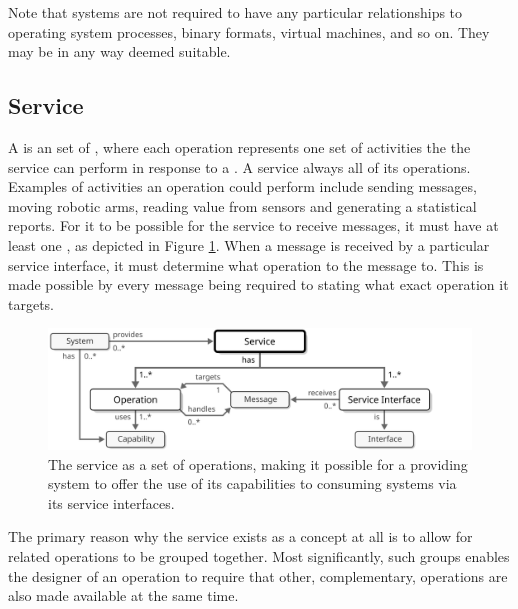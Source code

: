 Note that systems are not required to have any particular relationships to operating system processes, binary formats, virtual machines, and so on.
They may be  in any way deemed suitable.

\subsection{Service}
\label{sec:concepts:service}

A  is an  set of , where each operation represents one set of activities the   the service can perform in response to a .
A  service always  all of its operations.
Examples of activities an operation could perform include sending messages, moving robotic arms, reading value from sensors and generating a statistical reports.
For it to be possible for the service to receive messages, it must have at least one , as depicted in Figure \ref{fig:service}.
When a message is received by a particular service interface, it must determine what operation to  the message to.
This is made possible by every message being required to stating what exact operation it targets.

\begin{figure}[ht!]
  \centering
  \includegraphics[scale=0.9]{figures/service}
  \caption{
    The service as a set of operations, making it possible for a providing system to offer the use of its capabilities to consuming systems via its service interfaces.
  }
  \label{fig:service}
\end{figure}

The primary reason why the service exists as a concept at all is to allow for related operations to be grouped together.
Most significantly, such groups enables the designer of an operation to require that other, complementary, operations are also made available at the same time.

